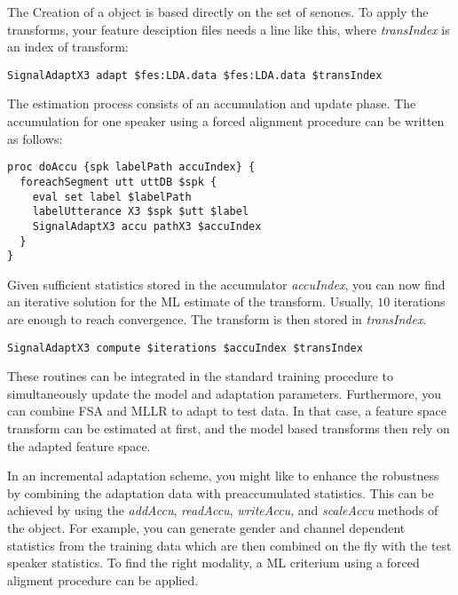 The Creation of a   object is based directly
on the  set  of  senones.   To   apply the transforms,   your  feature
desciption files needs a line like  this, where {\em transIndex} is an
index of transform:

\begin{verbatim}
SignalAdaptX3 adapt $fes:LDA.data $fes:LDA.data $transIndex
\end{verbatim}

The estimation process consists of  an accumulation and update  phase.
The  accumulation for one speaker  using  a forced alignment procedure
can be written as follows:

\begin{verbatim}
proc doAccu {spk labelPath accuIndex} {
  foreachSegment utt uttDB $spk {
    eval set label $labelPath
    labelUtterance X3 $spk $utt $label
    SignalAdaptX3 accu pathX3 $accuIndex
  }
}
\end{verbatim}

Given sufficient statistics stored in the accumulator {\em accuIndex},
you can now find   an iterative solution  for  the ML estimate of  the
transform.   Usually,   $10$   iterations    are  enough     to  reach
convergence. The transform is then stored in {\em transIndex}.

\begin{verbatim}
SignalAdaptX3 compute $iterations $accuIndex $transIndex
\end{verbatim}

These routines can be integrated in the standard training procedure to
simultaneously update the model and adaptation parameters. Furthermore,
you can  combine FSA and MLLR to  adapt to test data.  In that case, a
feature space transform can be estimated at first, and the model based
transforms then rely on the adapted feature space.

In  an incremental adaptation  scheme, you  might  like to enhance the
robustness  by combining  the   adaptation data  with   preaccumulated
statistics. This  can  be achieved  by  using the {\em  addAccu}, {\em
readAccu},   {\em   writeAccu}, and  {\em   scaleAccu}  methods of the
  object.   For example,   you can  generate
gender and channel  dependent statistics from  the training data which
are then combined on the fly with the test speaker statistics. To find
the right modality,  a ML criterium  using a forced aligment procedure
can be applied.

